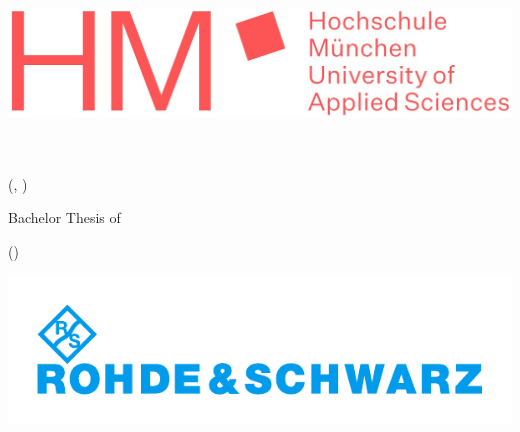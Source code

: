 \begin{titlepage}
    \centering  %

    \includegraphics[width=1\linewidth,keepaspectratio]{figures/logos/A_HM_Logo_incl_text.jpg}

    \vspace{1cm}

    {\Large\textcolor{HMColor}{\university}}\\  %
    {\large\uniDepartment}\\
    {\normalsize(\universityGer, \uniDepartmentGer)}\\

    \vspace{0.5cm}

    {\large Bachelor Thesis of}\\
    {\Large\textbf{\authorName}}

    \vspace{0.5cm}

    {\color{RSColor}\bfseries\LARGE{\thesisTitle} \par}
    {\normalsize(\thesisTitleGer)}\\
    \vspace{0.5cm}  %

    \includegraphics[width=0.6\linewidth,keepaspectratio]{figures/logos/X_logo_RS.pdf}

    \vspace{0.05cm}
    {\normalsize\textcolor{RSColor}{\company}}\\  %
    {\small\compDepartment}\\

    \vspace{1cm}


\end{titlepage}
